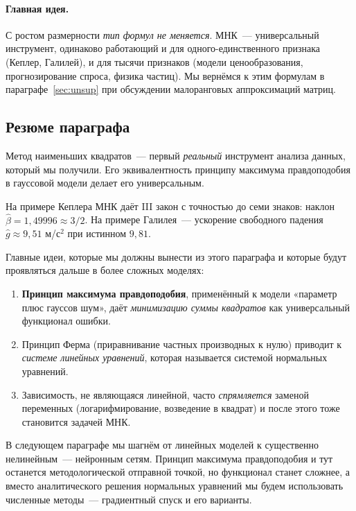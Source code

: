 \paragraph{Главная идея.}
С ростом размерности \emph{тип формул не меняется}. МНК~--- универсальный
инструмент, одинаково работающий и для одного-единственного признака
(Кеплер, Галилей), и для тысячи признаков (модели ценообразования,
прогнозирование спроса, физика частиц). Мы вернёмся к этим формулам в
параграфе~\ref{sec:unsup} при обсуждении малоранговых аппроксимаций
матриц.

\subsection{Резюме параграфа}

Метод наименьших квадратов~--- первый \emph{реальный} инструмент
анализа данных, который мы получили. Его эквивалентность принципу
максимума правдоподобия в гауссовой модели делает его универсальным.

На примере Кеплера МНК даёт III закон с точностью до семи знаков:
наклон $\hat\beta=1{,}49996\approx 3/2$. На примере Галилея~--- ускорение
свободного падения $\hat g\approx 9{,}51$ м/с$^{2}$ при истинном $9{,}81$.

Главные идеи, которые мы должны вынести из этого параграфа и которые
будут проявляться дальше в более сложных моделях:
\begin{enumerate}\itemsep1pt
  \item \textbf{Принцип максимума правдоподобия}, применённый к модели
        «параметр плюс гауссов шум», даёт \emph{минимизацию суммы
        квадратов} как универсальный функционал ошибки.
  \item Принцип Ферма (приравнивание частных производных к нулю)
        приводит к \emph{системе линейных уравнений}, которая
        называется системой нормальных уравнений.
  \item Зависимость, не являющаяся линейной, часто \emph{спрямляется}
        заменой переменных (логарифмирование, возведение в квадрат) и
        после этого тоже становится задачей МНК.
\end{enumerate}

В следующем параграфе мы шагнём от линейных моделей к существенно
нелинейным~--- нейронным сетям. Принцип максимума правдоподобия и тут
останется методологической отправной точкой, но функционал станет
сложнее, а вместо аналитического решения нормальных уравнений мы будем
использовать численные методы~--- градиентный спуск и его варианты.

